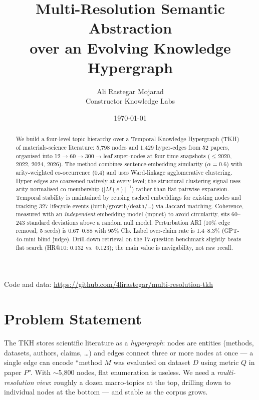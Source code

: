 \documentclass[10pt]{article}
\title{\textbf{Multi-Resolution Semantic Abstraction\\over an Evolving Knowledge Hypergraph}}
\author{Ali Rastegar Mojarad \\ \small Constructor Knowledge Labs}
\date{\today}
\begin{document}
\maketitle

\begin{abstract}
We build a four-level topic hierarchy over a Temporal Knowledge Hypergraph (TKH)
of materials-science literature: 5,798 nodes and 1,429 hyper-edges from 52 papers,
organised into 12$\to$60$\to$300$\to$leaf super-nodes at four time snapshots
($\leq$2020, 2022, 2024, 2026).
The method combines sentence-embedding similarity ($\alpha=0.6$) with
arity-weighted co-occurrence ($0.4$) and uses Ward-linkage agglomerative clustering.
Hyper-edges are coarsened natively at every level; the structural clustering signal
uses arity-normalised co-membership ($|M(e)|^{-1}$) rather than flat pairwise expansion.
Temporal stability is maintained by reusing cached embeddings for existing nodes
and tracking 327 lifecycle events (birth/growth/death/\ldots) via Jaccard matching.
Coherence, measured with an \emph{independent} embedding model (mpnet) to avoid
circularity, sits 60–243 standard deviations above a random null model.
Perturbation ARI (10\% edge removal, 5 seeds) is 0.67–0.88 with 95\% CIs.
Label over-claim rate is 1.4–8.3\% (GPT-4o-mini blind judge).
Drill-down retrieval on the 17-question benchmark slightly beats flat search
(HR@10: 0.132 vs.\ 0.123); the main value is navigability, not raw recall.
\end{abstract}

\begin{center}
  \small Code and data: \url{https://github.com/4lirastegar/multi-resolution-tkh}
\end{center}


\section{Problem Statement}\label{sec:formal}

The TKH stores scientific literature as a \emph{hypergraph}: nodes are entities
(methods, datasets, authors, claims, \ldots) and edges connect three or more nodes
at once — a single edge can encode ``method $M$ was evaluated on dataset $D$ using
metric $Q$ in paper $P$''.
With $\sim$5,800 nodes, flat enumeration is useless.
We need a \emph{multi-resolution view}: roughly a dozen macro-topics at the top,
drilling down to individual nodes at the bottom — and stable as the corpus grows.
\end{document}
